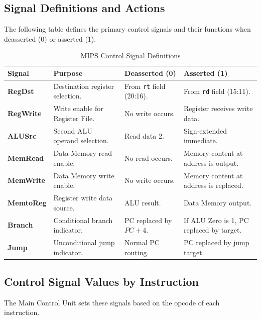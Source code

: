 \subsection{Signal Definitions and Actions}

The following table defines the primary control signals and their functions when deasserted (0) or asserted (1).

\begin{table}[h]
\centering
\footnotesize
\begin{tabularx}{\textwidth}{@{} l XXX @{}}
\toprule
\textbf{Signal} & \textbf{Purpose} & \textbf{Deasserted (0)} & \textbf{Asserted (1)} \\
\midrule
\textbf{RegDst} & Destination register selection. & From \texttt{rt} field (20:16). & From \texttt{rd} field (15:11). \\
\textbf{RegWrite} & Write enable for Register File. & No write occurs. & Register receives write data. \\
\textbf{ALUSrc} & Second ALU operand selection. & Read data 2. & Sign-extended immediate. \\
\textbf{MemRead} & Data Memory read enable. & No read occurs. & Memory content at address is output. \\
\textbf{MemWrite} & Data Memory write enable. & No write occurs. & Memory content at address is replaced. \\
\textbf{MemtoReg} & Register write data source. & ALU result. & Data Memory output. \\
\textbf{Branch} & Conditional branch indicator. & PC replaced by $PC + 4$. & If ALU Zero is 1, PC replaced by target. \\
\textbf{Jump} & Unconditional jump indicator. & Normal PC routing. & PC replaced by jump target. \\
\bottomrule
\end{tabularx}
\caption{MIPS Control Signal Definitions}
\end{table}

\subsection{Control Signal Values by Instruction}

The Main Control Unit sets these signals based on the opcode of each instruction.

